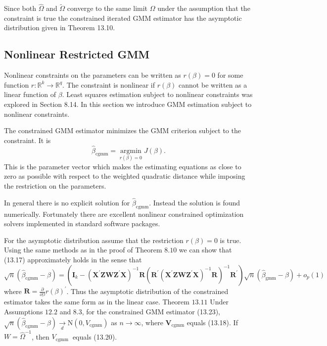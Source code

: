 \documentclass[10pt]{article}
\begin{document}
Since both $\widehat{\Omega}$ and $\widetilde{\Omega}$ converge to the same limit $\Omega$ under the assumption that the constraint is true the constrained iterated GMM estimator has the asymptotic distribution given in Theorem 13.10.

\subsection{Nonlinear Restricted GMM}
Nonlinear constraints on the parameters can be written as $r(\beta)=0$ for some function $r: \mathbb{R}^{k} \rightarrow \mathbb{R}^{q}$. The constraint is nonlinear if $r(\beta)$ cannot be written as a linear function of $\beta$. Least squares estimation subject to nonlinear constraints was explored in Section 8.14. In this section we introduce GMM estimation subject to nonlinear constraints.

The constrained GMM estimator minimizes the GMM criterion subject to the constraint. It is
$$
\widehat{\beta}_{\mathrm{cgmm}}=\underset{r(\beta)=0}{\operatorname{argmin}} J(\beta) .
$$
This is the parameter vector which makes the estimating equations as close to zero as possible with respect to the weighted quadratic distance while imposing the restriction on the parameters.

In general there is no explicit solution for $\widehat{\beta}_{\mathrm{cgmm}}$. Instead the solution is found numerically. Fortunately there are excellent nonlinear constrained optimization solvers implemented in standard software packages.

For the asymptotic distribution assume that the restriction $r(\beta)=0$ is true. Using the same methods as in the proof of Theorem $8.10$ we can show that (13.17) approximately holds in the sense that
$$
\sqrt{n}\left(\widehat{\beta}_{\mathrm{cgmm}}-\beta\right)=\left(\boldsymbol{I}_{k}-\left(\boldsymbol{X}^{\prime} \boldsymbol{Z} \boldsymbol{W} \boldsymbol{Z}^{\prime} \boldsymbol{X}\right)^{-1} \boldsymbol{R}\left(\boldsymbol{R}^{\prime}\left(\boldsymbol{X}^{\prime} \boldsymbol{Z} \boldsymbol{W} \boldsymbol{Z}^{\prime} \boldsymbol{X}\right)^{-1} \boldsymbol{R}\right)^{-1} \boldsymbol{R}^{\prime}\right) \sqrt{n}\left(\widehat{\beta}_{\mathrm{gmm}}-\beta\right)+o_{p}(1)
$$
where $\boldsymbol{R}=\frac{\partial}{\partial \beta} r(\beta)^{\prime}$. Thus the asymptotic distribution of the constrained estimator takes the same form as in the linear case. Theorem $13.11$ Under Assumptions $12.2$ and 8.3, for the constrained GMM estimator (13.23), $\sqrt{n}\left(\widehat{\beta}_{\mathrm{cgmm}}-\beta\right) \underset{d}{\longrightarrow} \mathrm{N}\left(0, V_{\mathrm{cgmm}}\right)$ as $n \rightarrow \infty$, where $\boldsymbol{V}_{\mathrm{cgmm}}$ equals (13.18). If $W=\widehat{\Omega}^{-1}$, then $V_{\text {cgmm }}$ equals (13.20).
\end{document}
